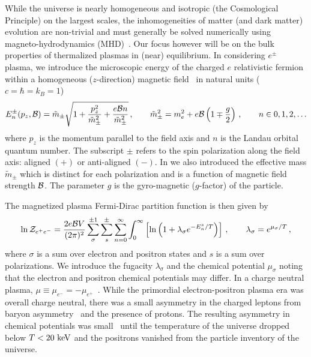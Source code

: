 \documentclass[a4paper]{article}
\begin{document}
While the universe is nearly homogeneous and isotropic (the Cosmological Principle) on the largest scales, the inhomogeneities of matter (and dark matter) evolution are non-trivial and must generally be solved numerically using magneto-hydrodynamics (MHD)~\cite{melrose2008quantum,vazza2017simulations}. Our focus however will be on the bulk properties of thermalized plasmas in (near) equilibrium. In considering $e^{\pm}$ plasma, we introduce the microscopic energy of the charged $e$ relativistic fermion within a homogeneous ($z$-direction) magnetic field~\cite{steinmetz2018magnetic} in natural units ($c=\hbar=k_{B}=1$)
\begin{align}
    \label{eigenenergy}
    E^{\pm}_{n}(p_{z},{\cal B})={\tilde m}_{\pm}\sqrt{1+\frac{p_{z}^{2}}{{\tilde m}_{\pm}^{2}}+\frac{e{\cal B}n}{{\tilde m}_{\pm}^{2}}}\,,\qquad {\tilde m}_{\pm}^{2}=m_{e}^{2}+e{\cal B}\left(1\mp\frac{g}{2}\right)\,,\qquad n\in0,1,2,\ldots
\end{align}
where $p_{z}$ is the momentum parallel to the field axis and $n$ is the Landau orbital quantum number. The subscript $\pm$ refers to the spin polarization along the field axis: aligned $(+)$ or anti-aligned $(-)$. In  we also introduced the effective mass ${\tilde m}_{\pm}$ which is distinct for each polarization and is a function of magnetic field strength ${\cal B}$. The parameter $g$ is the gyro-magnetic ($g$-factor) of the particle.

The magnetized plasma Fermi-Dirac partition function is then given by
\begin{align}
    \label{partition}
    \ln{\cal Z}_{e^{+}e^{-}}=\frac{2e{\cal B}V}{(2\pi)^{2}}\sum_{\sigma}^{\pm1}\sum_{s}^{\pm}\sum_{n=0}^{\infty}\int_{0}^{\infty}\left[\ln\left(1+\lambda_{\sigma}e^{-E_{n}^{s}/T}\right)\right]\,,\qquad\lambda_{\sigma}=e^{\mu_{\sigma}/T}\,,
\end{align}
where $\sigma$ is a sum over electron and positron states and $s$ is a sum over polarizations. We introduce the fugacity $\lambda_{\sigma}$ and the chemical potential $\mu_{\sigma}$ noting that the electron and positron chemical potentials may differ. In a charge neutral plasma, $\mu\equiv\mu_{e^{-}}=-\mu_{e^{+}}$~\cite{elze1980relativistic}. While the primordial electron-positron plasma era was overall charge neutral, there was a small asymmetry in the charged leptons from baryon asymmetry~\cite{canetti2012matter} and the presence of protons. The resulting asymmetry in chemical potentials was small~\cite{rafelski2023short} until the temperature of the universe dropped below $T<20\text{ keV}$ and the positrons vanished from the particle inventory of the universe.
\end{document}
